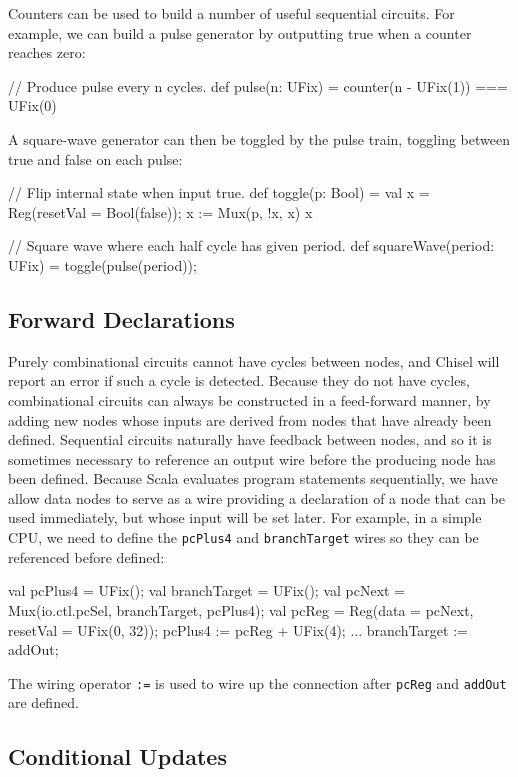 \documentclass[10pt]{article}
\begin{document}
Counters can be used to build a number of useful sequential circuits.
For example, we can build a pulse generator by outputting true when
a counter reaches zero:
\begin{scala}
// Produce pulse every n cycles.
def pulse(n: UFix) = counter(n - UFix(1)) === UFix(0)
\end{scala}

\noindent
A square-wave generator can then be toggled by the pulse train,
toggling between true and false on each pulse:
\begin{scala}
// Flip internal state when input true.
def toggle(p: Bool) = {
  val x = Reg(resetVal = Bool(false));
  x := Mux(p, !x, x)
  x
}

// Square wave where each half cycle has given period.
def squareWave(period: UFix) = toggle(pulse(period));
\end{scala}

\subsection{Forward Declarations}

Purely combinational circuits cannot have cycles between nodes, and
Chisel will report an error if such a cycle is detected.  Because they
do not have cycles, combinational circuits can always be constructed
in a feed-forward manner, by adding new nodes whose inputs are derived
from nodes that have already been defined.  Sequential circuits
naturally have feedback between nodes, and so it is sometimes
necessary to reference an output wire before the producing node has
been defined.  Because Scala evaluates program statements
sequentially, we have allow data nodes to serve as a wire providing
a declaration of a node that can be used immediately, but whose
input will be set later.  
For example, in a simple CPU, we need to define the \verb!pcPlus4!
and \verb!branchTarget! wires so they can be referenced before defined:
\begin{scala}
val pcPlus4      = UFix();
val branchTarget = UFix();
val pcNext       = Mux(io.ctl.pcSel, branchTarget, pcPlus4);
val pcReg        = Reg(data = pcNext, resetVal = UFix(0, 32));
pcPlus4         := pcReg + UFix(4);
...
branchTarget    := addOut;
\end{scala}

\noindent
The wiring operator
\verb!:=! is used to wire up
the connection after \verb!pcReg! and \verb!addOut! are defined.

\subsection{Conditional Updates}
\end{document}
